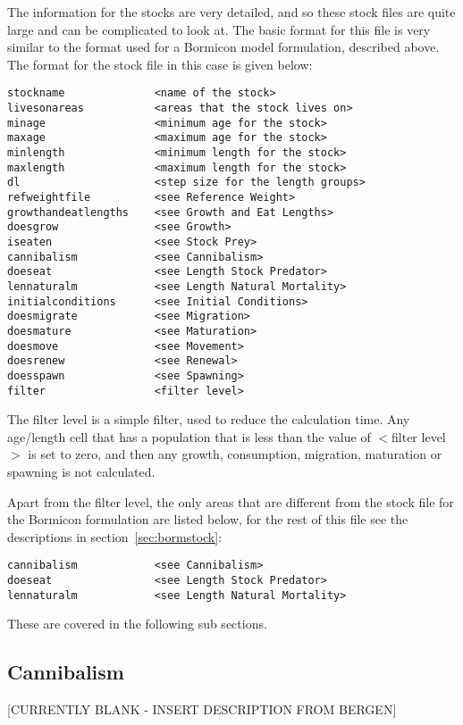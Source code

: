 \documentclass [a4paper, 10pt]{book}
\begin{document}
The information for the stocks are very detailed, and so these stock files are quite large and can be complicated to look at.  The basic format for this file is very similar to the format used for a Bormicon model formulation, described above.  The format for the stock file in this case is given below:

{\small\begin{verbatim}
stockname              <name of the stock>
livesonareas           <areas that the stock lives on>
minage                 <minimum age for the stock>
maxage                 <maximum age for the stock>
minlength              <minimum length for the stock>
maxlength              <maximum length for the stock>
dl                     <step size for the length groups>
refweightfile          <see Reference Weight>
growthandeatlengths    <see Growth and Eat Lengths>
doesgrow               <see Growth>
iseaten                <see Stock Prey>
cannibalism            <see Cannibalism>
doeseat                <see Length Stock Predator>
lennaturalm            <see Length Natural Mortality>
initialconditions      <see Initial Conditions>
doesmigrate            <see Migration>
doesmature             <see Maturation>
doesmove               <see Movement>
doesrenew              <see Renewal>
doesspawn              <see Spawning>
filter                 <filter level>
\end{verbatim}}

The filter level is a simple filter, used to reduce the calculation time.  Any age/length cell that has a population that is less than the value of $<$filter level$>$ is set to zero, and then any growth, consumption, migration, maturation or spawning is not calculated.

\bigskip
Apart from the filter level, the only areas that are different from the stock file for the Bormicon formulation are listed below, for the rest of this file see the descriptions in section~\ref{sec:bormstock}:

{\small\begin{verbatim}
cannibalism            <see Cannibalism>
doeseat                <see Length Stock Predator>
lennaturalm            <see Length Natural Mortality>
\end{verbatim}}

These are covered in the following sub sections.

\subsection{Cannibalism}\label{subsec:stockcannibalism}
[CURRENTLY BLANK - INSERT DESCRIPTION FROM BERGEN]
\end{document}
